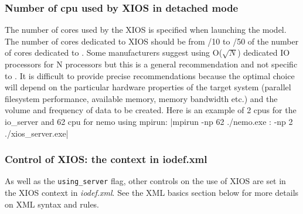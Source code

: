 \documentclass[../main/NEMO_manual]{subfiles}
\begin{document}
\subsubsection{Number of cpu used by XIOS in detached mode}

The number of cores used by the XIOS is specified when launching the model.
The number of cores dedicated to XIOS should be from /10 to /50 of the number of
cores dedicated to \NEMO.
Some manufacturers suggest using O($\sqrt{N}$) dedicated IO processors for N processors but
this is a general recommendation and not specific to \NEMO.
It is difficult to provide precise recommendations because the optimal choice will depend on
the particular hardware properties of the target system
(parallel filesystem performance, available memory, memory bandwidth etc.)
and the volume and frequency of data to be created.
Here is an example of 2 cpus for the io\_server and 62 cpu for nemo using mpirun:
\cmd|mpirun -np 62 ./nemo.exe : -np 2 ./xios_server.exe|

\subsubsection{Control of XIOS: the context in iodef.xml}

As well as the \texttt{using\_server} flag, other controls on the use of XIOS are set in
the XIOS context in \textit{iodef.xml}.
See the XML basics section below for more details on XML syntax and rules.
\end{document}
